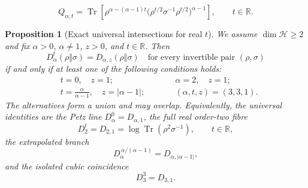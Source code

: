 \documentclass[10pt,a4paper]{amsart}
\newtheorem{proposition}{Proposition}
\begin{document}
\begin{equation}
 Q_{\alpha,t}
 =\operatorname{Tr}\!\left[
  \rho^{\alpha-(\alpha-1)t}
  \bigl(\rho^{t/2}\sigma^{-1}\rho^{t/2}\bigr)^{\alpha-1}
 \right],
 \qquad t\in\mathbb R.
 \label{rw:eq:power-functional-push-through}
\end{equation}

\begin{proposition}[Exact universal intersections for real $t$]
\label{rw:prop:alpha-z-intersections}
We assume $\dim\mathcal H\geq2$ and fix $\alpha>0$, $\alpha\neq1$,
$z>0$, and $t\in\mathbb R$.  Then
\begin{equation}
 D_\alpha^t(\rho\Vert\sigma)
 =D_{\alpha,z}(\rho\Vert\sigma)
 \quad\text{for every invertible pair }(\rho,\sigma)
 \label{rw:eq:alpha-z-universal-equality}
\end{equation}
if and only if at least one of the following conditions holds:
\begin{equation}
 \begin{aligned}
 &t=0,\quad z=1;\qquad
 &&\alpha=2,\quad z=1;\\
 &t=\frac{\alpha}{\alpha-1},\quad
   z=\lvert\alpha-1\rvert;\qquad
 &&(\alpha,t,z)=(3,3,1).
 \end{aligned}
 \label{rw:eq:alpha-z-intersection-locus}
\end{equation}
The alternatives form a union and may overlap.  Equivalently, the
universal identities are the Petz line $D_\alpha^0=D_{\alpha,1}$,
the full real order-two fibre
\begin{equation}
 D_2^t=D_{2,1}
 =\log\operatorname{Tr}(\rho^2\sigma^{-1}),
 \qquad t\in\mathbb R,
 \label{rw:eq:alpha-z-order-two-fibre}
\end{equation}
the extrapolated branch
\begin{equation}
 D_\alpha^{\,\alpha/(\alpha-1)}
 =D_{\alpha,\lvert\alpha-1\rvert},
 \label{rw:eq:alpha-z-extrapolated-intersection}
\end{equation}
and the isolated cubic coincidence
\begin{equation}
 D_3^3=D_{3,1}.
 \label{rw:eq:alpha-z-cubic-intersection}
\end{equation}
\end{proposition}
\end{document}
